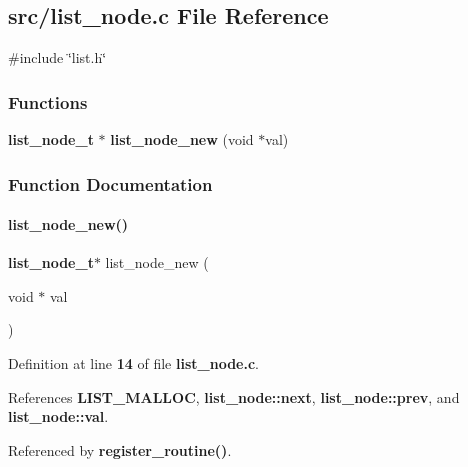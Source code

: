 \subsection{src/list\+\_\+node.c File Reference}
\label{list__node_8c}
{\ttfamily \#include \char`\"{}list.\+h\char`\"{}}\newline
\subsubsection*{Functions}
\begin{DoxyCompactItemize}
\item 
\textbf{ list\+\_\+node\+\_\+t} $\ast$ \textbf{ list\+\_\+node\+\_\+new} (void $\ast$val)
\end{DoxyCompactItemize}


\subsubsection{Function Documentation}
\mbox{\label{list__node_8c_a4ef36e0519514ac481d0d7e0b439d431}} 
\paragraph{list\+\_\+node\+\_\+new()}
{\footnotesize\ttfamily \textbf{ list\+\_\+node\+\_\+t}$\ast$ list\+\_\+node\+\_\+new (\begin{DoxyParamCaption}\item[{void $\ast$}]{val }\end{DoxyParamCaption})}



Definition at line \textbf{ 14} of file \textbf{ list\+\_\+node.\+c}.



References \textbf{ L\+I\+S\+T\+\_\+\+M\+A\+L\+L\+OC}, \textbf{ list\+\_\+node\+::next}, \textbf{ list\+\_\+node\+::prev}, and \textbf{ list\+\_\+node\+::val}.



Referenced by \textbf{ register\+\_\+routine()}.

